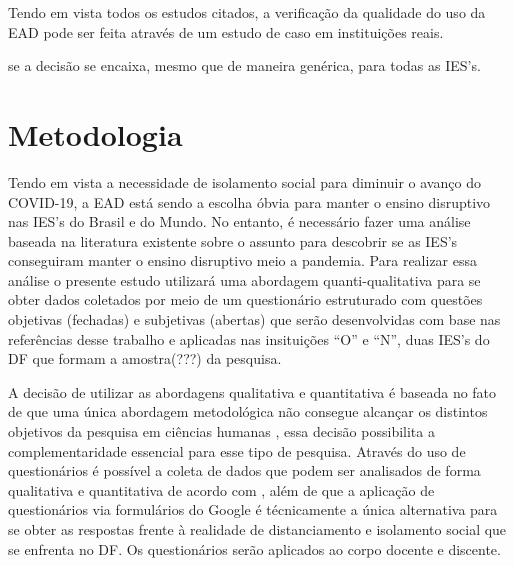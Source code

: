 \documentclass[
	arial,
	12pt,				%
	openright,			%
	twoside,			%
	a4paper,			%
	chapter=TITLE,		%
	english,			%
	french,				%
	spanish,			%
	brazil,				%
	]{abntex2}
\begin{document}
Tendo em vista todos os estudos citados, a verificação da qualidade do uso da EAD pode ser feita através de um estudo de caso em instituições reais.



 se a decisão se encaixa, mesmo que de maneira genérica, para todas as IES's. 





\chapter{Metodologia}

Tendo em vista a necessidade de isolamento social para diminuir o avanço do COVID-19, a EAD está sendo a escolha óbvia para manter o ensino disruptivo nas IES's do Brasil e do Mundo. No entanto, é necessário fazer uma análise baseada na literatura existente sobre o assunto para descobrir se as IES's conseguiram manter o ensino disruptivo meio a pandemia. Para realizar essa análise o presente estudo utilizará uma abordagem quanti-qualitativa   \cite{elielCruz} para se obter dados coletados por meio de um questionário estruturado com questões objetivas (fechadas) e subjetivas (abertas) que serão desenvolvidas com base nas referências desse trabalho e aplicadas nas insituições ``O'' e ``N'', duas IES's do DF que formam a amostra(???) da pesquisa.

A decisão de utilizar as abordagens qualitativa e quantitativa é baseada no fato de que uma única abordagem metodológica não consegue alcançar os distintos objetivos da pesquisa em ciências humanas \cite{santos}, essa decisão possibilita a complementaridade essencial para esse tipo de pesquisa. Através do uso de questionários é possível a coleta de dados que podem ser analisados de forma qualitativa e quantitativa de acordo com , além de que a aplicação de questionários via formulários do Google é técnicamente a única alternativa para se obter as respostas frente à realidade de distanciamento e isolamento social que se enfrenta no DF. Os questionários serão aplicados ao corpo docente e discente.  
\end{document}
